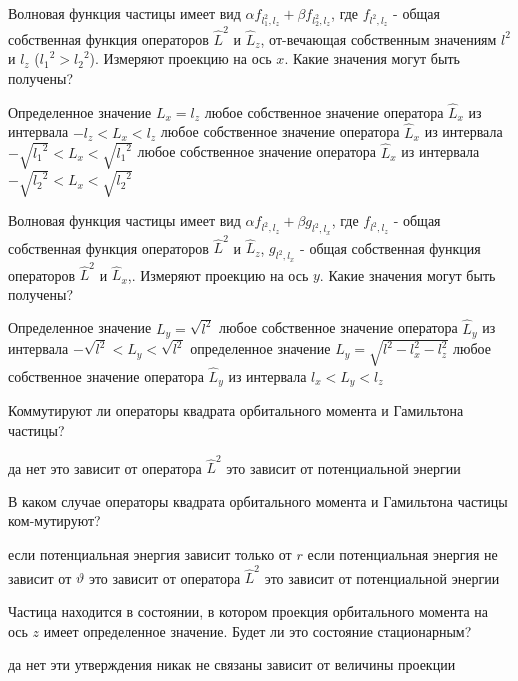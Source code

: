 \documentclass[11pt,a4paper]{exam}
\begin{document}
\begin{questions}
\question Волновая функция частицы имеет вид $\alpha {f_{l_1^2,{l_z}}} + \beta {f_{l_2^2,{l_z}}}$, где ${f_{{l^2},{l_z}}}$ - общая собственная функция операторов ${\hat L^2}$ и ${\hat L_z}$, от-вечающая собственным значениям ${l^2}$ и ${l_z}$ (${l_1}^2 > {l_2}^2$). Измеряют проекцию на ось $x$. Какие значения могут быть получены?
\begin{choices}
\choice Определенное значение ${L_x} = {l_z}$
\choice любое собственное значение оператора ${\hat L_x}$ из интервала $ - {l_z} < {L_x} < {l_z}$
\choice любое собственное значение оператора ${\hat L_x}$ из интервала $ - \sqrt {{l_1}^2}  < {L_x} < \sqrt {{l_1}^2} $
\choice любое собственное значение оператора ${\hat L_x}$ из интервала $ - \sqrt {{l_2}^2}  < {L_x} < \sqrt {{l_2}^2} $ 
\end{choices}

\question Волновая функция частицы имеет вид $\alpha {f_{l_{}^2,{l_z}}} + \beta {g_{l_{}^2,{l_x}}}$, где ${f_{{l^2},{l_z}}}$ - общая собственная функция операторов ${\hat L^2}$ и ${\hat L_z}$, ${g_{l_{}^2,{l_x}}}$ - общая собственная функция операторов ${\hat L^2}$ и ${\hat L_x}$,. Измеряют проекцию на ось $y$. Какие значения могут быть получены?
\begin{choices}
\choice Определенное значение ${L_y} = \sqrt {{l^2}} $
\choice любое собственное значение оператора ${\hat L_y}$ из интервала $ - \sqrt {{l^2}}  < {L_y} < \sqrt {{l^2}} $
\choice определенное значение ${L_y} = \sqrt {{l^2} - l_x^2 - l_z^2} $ 
\choice любое собственное значение оператора ${\hat L_y}$ из интервала ${l_x} < {L_y} < {l_z}$
\end{choices}

\question Коммутируют ли операторы квадрата орбитального момента и Гамильтона частицы?
\begin{choices}
\choice да             
\choice нет
\choice это зависит от оператора ${\hat L^2}$  
\choice это зависит от потенциальной энергии
\end{choices}

\question В каком случае операторы квадрата орбитального момента и Гамильтона частицы ком-мутируют?
\begin{choices}
\choice если потенциальная энергия зависит только от $r$
\choice если потенциальная энергия не зависит от $\vartheta $
\choice это зависит от оператора ${\hat L^2}$  
\choice это зависит от потенциальной энергии
\end{choices}

\question Частица находится в состоянии, в котором проекция орбитального момента на ось $z$ имеет определенное значение. Будет ли это состояние стационарным?
\begin{choices}
\choice да                   
\choice нет
\choice эти утверждения никак не связаны    
\choice зависит от величины проекции
\end{choices}


\end{questions}
\end{document}
